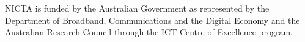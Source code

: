 NICTA is funded by the Australian Government 
as represented by the Department 
of Broadband, Communications and the Digital Economy 
and the Australian Research Council 
through the ICT Centre of Excellence program.
